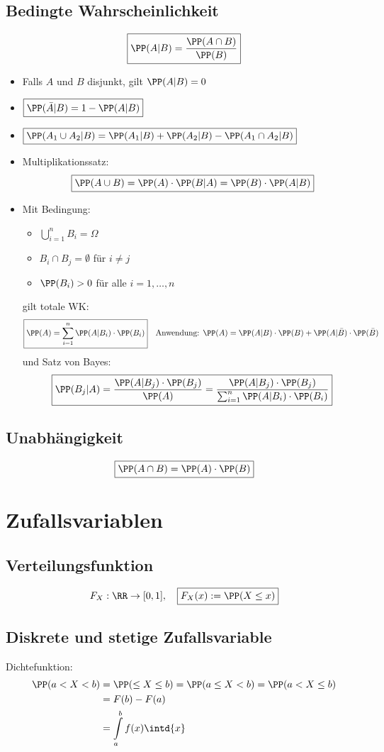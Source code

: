 \subsection{Bedingte Wahrscheinlichkeit}
$$\boxed{\PP(A|B)=\frac{\PP(A \cap B)}{\PP(B)}}$$
\begin{itemize}
\item Falls $A$ und $B$ disjunkt, gilt $\PP(A|B)=0$
\item $\boxed{\PP(\bar A | B) = 1-\PP(A|B)}$
\item $\boxed{\PP(A_1 \cup A_2 | B ) =\PP(A_1 | B ) + \PP (A_2|B) - \PP (A_1 \cap A_2 | B)}$
\item Multiplikationssatz:
$$\boxed{\PP(A\cup B ) = \PP(A ) \cdot \PP(B|A) = \PP(B) \cdot \PP(A|B)}$$
\item Mit Bedingung:
\begin{itemize}
\item $\bigcup_{i=1}^n B_i = \Omega$
\item $B_i \cap B_j = \emptyset $ für $i \not= j$
\item $\PP (B_i) >0$ für alle $i=1,\dots,n$
\end{itemize}
gilt totale WK:
$$\boxed{\PP(A) = \sum_{i=1}^n \PP(A|B_i) \cdot \PP (B_i)} \quad \text{Anwendung: }\PP(A)=\PP(A|B)\cdot \PP(B) + \PP(A | \bar B) \cdot \PP(\bar B)$$
und Satz von Bayes:
$$\boxed{\PP(B_j|A)=\frac{\PP(A|B_j)\cdot \PP(B_j)}{\PP(A)}=\frac{\PP(A|B_j)\cdot \PP(B_j)}{\sum_{i=1}^n \PP(A|B_i) \cdot \PP(B_i)}}$$
\end{itemize}


\subsection{Unabhängigkeit}
$$\boxed{\PP(A\cap B)=\PP(A) \cdot \PP(B)}$$

\section{Zufallsvariablen}

\subsection{Verteilungsfunktion}
$$F_X: \RR\to [0,1], \quad \boxed{F_X(x):=\PP(X \leq x)}$$

\subsection{Diskrete und stetige Zufallsvariable}
Dichtefunktion:
\begin{align*}
\PP(a < X<b) &= \PP(\leq X \leq b)
= \PP(a \leq X <b) 
= \PP(a < X \leq b)\\
&=F(b)-F(a) \\
&= \int\limits_a^b f(x) \intd{x}
\end{align*}

